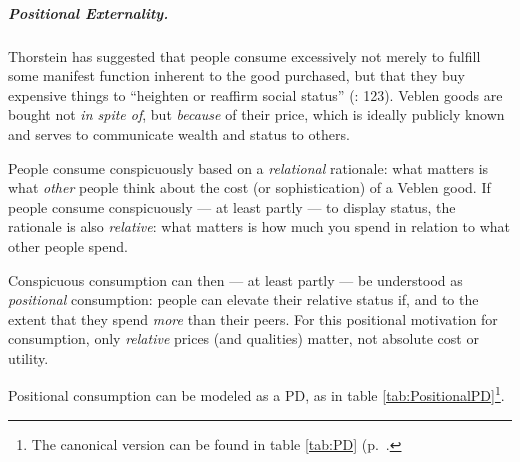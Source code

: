 \subparagraph{Positional Externality.}  \label{sec:positionalrace} Thorstein \cite{Veblen1899} has suggested that people consume excessively not merely to fulfill some manifest function inherent to the good purchased, but that they buy expensive things to ``heighten or reaffirm social status'' (\citealt{Merton-1968-aa}: 123). Veblen goods are bought not \emph{in spite of}, but \emph{because} of their price, which is ideally publicly known and serves to communicate wealth and status to others.

People consume conspicuously based on a \emph{relational} rationale: what matters is what \emph{other} people think about the cost (or sophistication) of a Veblen good. If people consume conspicuously --- at least partly --- to display status, the rationale is also \emph{relative}: what matters is how much you spend in relation to what other people spend. 

Conspicuous consumption can then --- at least partly --- be understood as \emph{positional} consumption: people can elevate their relative status if, and to the extent that they spend \emph{more} than their peers. For this positional motivation for consumption, only \emph{relative} prices (and qualities) matter, not absolute cost or utility.

Positional consumption can be modeled as a \gls{PD}, as in table \ref{tab:PositionalPD}\footnote{
	The canonical version can be found in table \ref{tab:PD} (p.~\pageref{tab:PD}.}.

